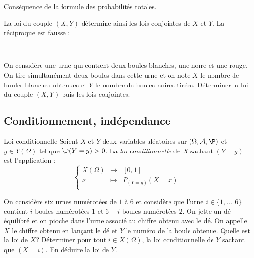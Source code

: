 \documentclass[french,11pt,twoside]{VcCours}
\begin{document}
\begin{Demonstration}{} Conséquence de la formule des probabilités totales.
%
\end{Demonstration}
\begin{Remarque}[\alerte]{} La loi du couple $(X,Y)$ détermine ainsi les lois conjointes de $X$ et $Y$. La réciproque est fausse :

\vspace*{3cm}~
\end{Remarque}

\begin{ApplicationDirecte}{} On considère une urne qui contient deux boules blanches, une noire et une rouge. On tire simultanément deux boules dans cette urne et on note $X$ le nombre de boules blanches obtenues et $Y$ le nombre de boules noires tirées. Déterminer la loi du couple $(X,Y)$ puis les lois conjointes.
\end{ApplicationDirecte}
\subsection{Conditionnement, indépendance}

\begin{Definition}{Loi conditionnelle} Soient $X$ et $Y$ deux variables aléatoires sur $(\Omega, \mathcal{A}, \P)$ et $y \in Y(\Omega)$ tel que $\P(Y=y)>0$. La \emph{loi conditionnelle} de $X$ sachant $(Y=y)$ est l'application :
$$ \left\lbrace \begin{array}{ccl}
X(\Omega) & \longrightarrow & [0,1] \\
x & \longmapsto & P_{(Y=y)}(X=x) \\
\end{array}\right.$$
\end{Definition}

\begin{Exemple}{} On considère six urnes numérotées de $1$ à $6$ et considère que l'urne $i \in \lbrace 1, \ldots, 6 \rbrace$ contient $i$ boules numérotées $1$ et $6-i$ boules numérotées $2$. On jette un dé équilibré et on pioche dans l'urne associé au chiffre obtenu avec le dé. On appelle $X$ le chiffre obtenu en lançant le dé et $Y$ le numéro de la boule obtenue. Quelle est la loi de $X$? Déterminer pour tout $i \in X(\Omega)$, la loi conditionnelle de $Y$ sachant que $(X=i)$. En déduire la loi de $Y$.

\vspace*{10cm}
\end{Exemple}
\end{document}
